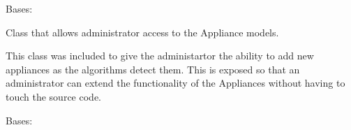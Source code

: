 \documentclass[letterpaper,10pt,english]{sphinxmanual}
\begin{document}
\begin{fulllineitems}
\label{modules/microdata:microdata.admin.ApplianceAdmin}
Bases: 

Class that allows administrator access to the Appliance models.

This class was included to give the administartor the ability to add new appliances
as the algorithms detect them. This is exposed so that an administrator can extend
the functionality of the Appliances without having to touch the source code.

\begin{fulllineitems}
\label{modules/microdata:microdata.admin.ApplianceAdmin.list_display}
\end{fulllineitems}


\begin{fulllineitems}
\label{modules/microdata:microdata.admin.ApplianceAdmin.media}
\end{fulllineitems}


\end{fulllineitems}


\begin{fulllineitems}
\label{modules/microdata:microdata.admin.CircuitAdmin}
Bases: 

\begin{fulllineitems}
\label{modules/microdata:microdata.admin.CircuitAdmin.list_display}
\end{fulllineitems}


\begin{fulllineitems}
\label{modules/microdata:microdata.admin.CircuitAdmin.media}
\end{fulllineitems}


\end{fulllineitems}
\end{document}
